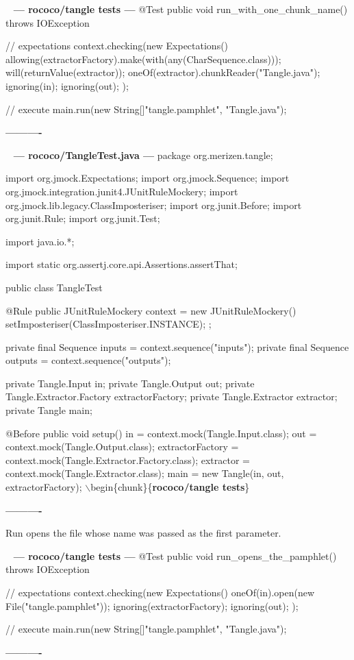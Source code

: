 \documentclass{book}
\newenvironment{chunk}[1]{%
{\ }\newline\noindent%
\hbox{\hskip 2.0cm}{\bf --- #1 ---}%
\verbatim}%                               say exactly what we see
{\endverbatim%
\par{}%
\noindent{}%
\hbox{\hskip 2.0cm}{\bf ----------}%
\par%
\normalsize\noindent}%
\providecommand{\getchunk}[1]{%
\noindent%
{\small $\backslash{}$begin\{chunk\}\{{\bf #1}\}}%
\index{{#1}}}
\begin{document}
\begin{chunk}{rococo/tangle tests}
@Test
public void run_with_one_chunk_name() throws IOException {
    // expectations
    context.checking(new Expectations() {{
        allowing(extractorFactory).make(with(any(CharSequence.class)));
        will(returnValue(extractor));
        oneOf(extractor).chunkReader("Tangle.java");
        ignoring(in);
        ignoring(out);
    }});

    // execute
    main.run(new String[]{"tangle.pamphlet", "Tangle.java"});
}
\end{chunk}

\begin{chunk}{rococo/TangleTest.java}
package org.merizen.tangle;

import org.jmock.Expectations;
import org.jmock.Sequence;
import org.jmock.integration.junit4.JUnitRuleMockery;
import org.jmock.lib.legacy.ClassImposteriser;
import org.junit.Before;
import org.junit.Rule;
import org.junit.Test;

import java.io.*;

import static org.assertj.core.api.Assertions.assertThat;

public class TangleTest {
    @Rule
    public JUnitRuleMockery context = new JUnitRuleMockery() {{
        setImposteriser(ClassImposteriser.INSTANCE);
    }};

    private final Sequence inputs = context.sequence("inputs");
    private final Sequence outputs = context.sequence("outputs");

    private Tangle.Input in;
    private Tangle.Output out;
    private Tangle.Extractor.Factory extractorFactory;
    private Tangle.Extractor extractor;
    private Tangle main;

    @Before
    public void setup() {
        in = context.mock(Tangle.Input.class);
        out = context.mock(Tangle.Output.class);
        extractorFactory = context.mock(Tangle.Extractor.Factory.class);
        extractor = context.mock(Tangle.Extractor.class);
        main = new Tangle(in, out, extractorFactory);
    }
\getchunk{rococo/tangle tests}
}
\end{chunk}

Run opens the file whose name was passed as the first parameter.

\begin{chunk}{rococo/tangle tests}
@Test
public void run_opens_the_pamphlet() throws IOException {
    // expectations
    context.checking(new Expectations() {{
        oneOf(in).open(new File("tangle.pamphlet"));
        ignoring(extractorFactory);
        ignoring(out);
    }});

    // execute
    main.run(new String[]{"tangle.pamphlet", "Tangle.java"});
}
\end{chunk}
\end{document}
